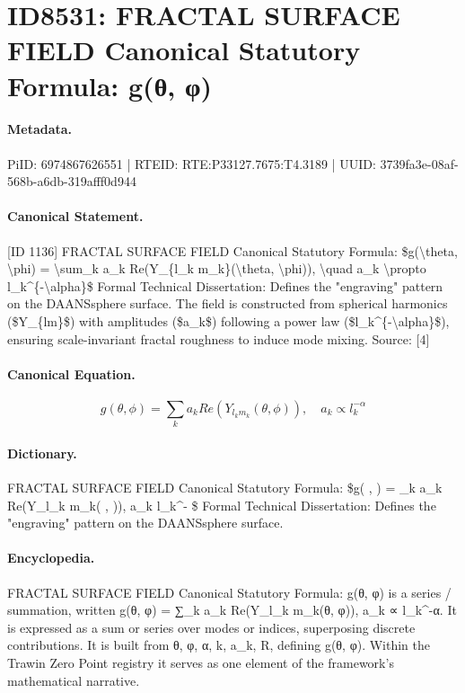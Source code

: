 \section*{ID8531: FRACTAL SURFACE FIELD Canonical Statutory Formula: g(θ, φ)}
\paragraph{Metadata.}
PiID: 6974867626551 | RTEID: RTE:P33127.7675:T4.3189 | UUID: 3739fa3e-08af-568b-a6db-319afff0d944

\paragraph{Canonical Statement.}
[ID 1136] FRACTAL SURFACE FIELD Canonical Statutory Formula: \$g(\textbackslash{}theta, \textbackslash{}phi) = \textbackslash{}sum\_k a\_k Re(Y\_\{l\_k m\_k\}(\textbackslash{}theta, \textbackslash{}phi)), \textbackslash{}quad a\_k \textbackslash{}propto l\_k\textasciicircum{}\{-\textbackslash{}alpha\}\$ Formal Technical Dissertation: Defines the "engraving" pattern on the DAANSsphere surface. The field is constructed from spherical harmonics (\$Y\_\{lm\}\$) with amplitudes (\$a\_k\$) following a power law (\$l\_k\textasciicircum{}\{-\textbackslash{}alpha\}\$), ensuring scale-invariant fractal roughness to induce mode mixing. Source: [4]

\paragraph{Canonical Equation.}
\[
g(\theta, \phi) = \sum_k a_k Re(Y_{l_k m_k}(\theta, \phi)), \quad a_k \propto l_k^{-\alpha}
\]

\paragraph{Dictionary.}
FRACTAL SURFACE FIELD Canonical Statutory Formula: \$g( , ) = \_k a\_k Re(Y\_l\_k m\_k( , )), a\_k l\_k\textasciicircum{}- \$ Formal Technical Dissertation: Defines the "engraving" pattern on the DAANSsphere surface.

\paragraph{Encyclopedia.}
FRACTAL SURFACE FIELD Canonical Statutory Formula: g(θ, φ) is a series / summation, written g(θ, φ) = ∑\_k a\_k Re(Y\_l\_k m\_k(θ, φ)), a\_k ∝ l\_k\textasciicircum{}-α. It is expressed as a sum or series over modes or indices, superposing discrete contributions. It is built from θ, φ, α, k, a\_k, R, defining g(θ, φ). Within the Trawin Zero Point registry it serves as one element of the framework's mathematical narrative.

